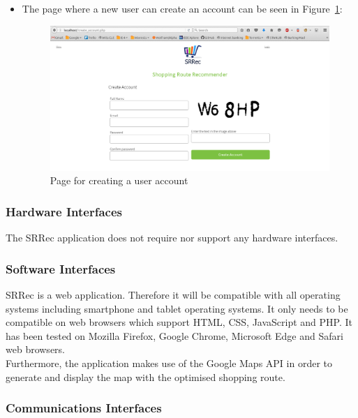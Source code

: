 \documentclass[10pt,twocolumn]{witseiepaper}
\begin{document}
\begin{itemize}
			\item The page where a new user can create an account can be seen in Figure~\ref{create account page}:
			\begin{figure}[htbp]
				\centering
				\includegraphics[width = \columnwidth]{../images/create_account_new.png}
				\caption{Page for creating a user account}
				\label{create account page}
			\end{figure}
			
		\end{itemize}
		
		\subsubsection{Hardware Interfaces}
		
		The SRRec application does not require nor support any hardware interfaces.
		
		\subsubsection{Software Interfaces}
		
		SRRec is a web application. Therefore it will be compatible with all operating systems including smartphone and tablet operating systems. It only needs to be compatible on web browsers which support HTML, CSS, JavaScript and PHP. It has been tested on Mozilla Firefox, Google Chrome, Microsoft Edge and Safari web browsers. \\
		
		Furthermore, the application makes use of the Google Maps API in order to generate and display the map with the optimised shopping route. 
		
		\subsubsection{Communications Interfaces}
		
\end{document}
